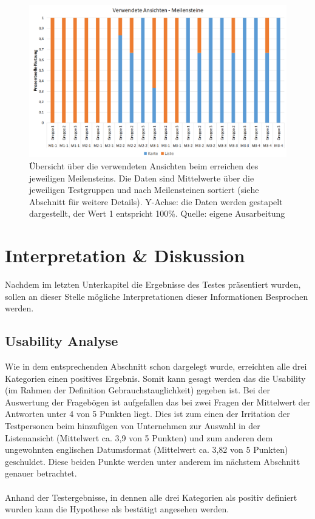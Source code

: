 \documentclass[Bachelorarbeit.tex]{subfiles}
\begin{document}
\begin{figure}[h]
\centering
\includegraphics[width=1\linewidth]{img/Evaluation/Meilenstein}
\caption[Verwendete Ansichten - Meilensteine]{
	Übersicht über die verwendeten Ansichten beim erreichen des jeweiligen Meilensteins. Die Daten sind Mittelwerte über die jeweiligen Testgruppen und nach Meilensteinen sortiert (siehe Abschnitt  für weitere Details). Y-Achse: die Daten werden gestapelt dargestellt, der Wert 1 entspricht 100\%.
	Quelle: eigene Ausarbeitung
	}
\label{fig:Meilenstein}
\end{figure}



\section{Interpretation \& Diskussion}
\label{InterpretationDiskussion}
Nachdem im letzten Unterkapitel die Ergebnisse des Testes präsentiert wurden, sollen an dieser Stelle mögliche Interpretationen dieser Informationen Besprochen werden.

\subsection{Usability Analyse}
Wie in dem entsprechenden Abschnitt schon dargelegt wurde, erreichten alle drei Kategorien einen positives Ergebnis. 
Somit kann gesagt werden das die Usability (im Rahmen der Definition Gebrauchstauglichkeit) gegeben ist. 
Bei der Auswertung der Fragebögen ist aufgefallen das bei zwei Fragen der Mittelwert der Antworten unter 4 von 5 Punkten liegt. 
Dies ist zum einen der Irritation der Testpersonen beim hinzufügen von Unternehmen zur Auswahl in der Listenansicht (Mittelwert ca. 3,9 von 5 Punkten) und zum anderen dem ungewohnten englischen Datumsformat (Mittelwert ca. 3,82 von 5 Punkten) geschuldet.
Diese beiden Punkte werden unter anderem im nächstem Abschnitt genauer betrachtet.\\
\\
Anhand der Testergebnisse, in dennen alle drei Kategorien als positiv definiert wurden kann die Hypothese als bestätigt angesehen werden.  
\end{document}
